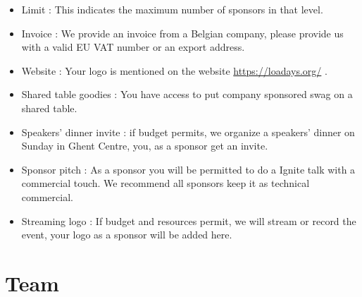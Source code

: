 \begin{itemize}
\item
Limit : This indicates the maximum number of sponsors in that level.
\item
Invoice : We provide an invoice from a Belgian company, please provide us with a valid EU VAT number or an export address.
\item
Website : Your logo is mentioned on the website \url{https://loadays.org/} .
\item
Shared table goodies : You have access to put company sponsored swag on a shared table.
\item
Speakers' dinner invite : if budget permits, we organize a speakers' dinner on Sunday in Ghent Centre, you, as a sponsor get an invite.
\item
Sponsor pitch : As a sponsor you will be permitted to do a Ignite talk with a commercial touch. We recommend all sponsors keep it as technical commercial.
\item
Streaming logo : If budget and resources permit, we will stream or record the event, your logo as a sponsor will be added here.
\end{itemize}

\section{Team}



